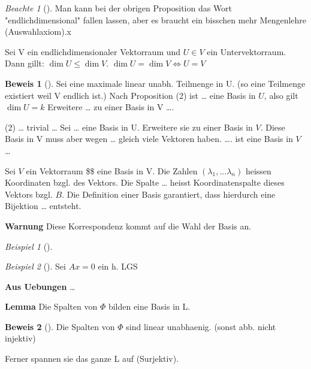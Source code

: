 \documentclass[11pt]{article}
\theoremstyle{remark}
\newtheorem{exa}{Beispiel}[section]
\newtheorem*{notte}{Beachte}
\theoremstyle{definition}
\newtheorem{prof}{Beweis}
\theoremstyle{remark}
\begin{document}
\begin{notte}[] \label{}
Man kann bei der obrigen Proposition das Wort "endlichdimensional" fallen
lassen, aber es braucht ein bisschen mehr Mengenlehre (Auswahlaxiom).x
\end{notte}


\begin{theo}{}{}
Sei V ein endlichdimensionaler Vektorraum und \(U\in V\) ein Untervektorraum. Dann
gillt: \(\dim U \leq \dim V\).  \(\dim U = \dim V \iff U=V\)
\end{theo}

\begin{prof}[] \label{}
Sei eine maximale linear unabh. Teilmenge in U. (so eine Teilmenge existiert
weil V endlich ist.)
Nach Proposition (2) ist \ldots{} eine Basis in \(U\), also gilt \(\dim U = k\) Erweitere
\ldots{} zu einer Basis in V \ldots{}. 

(2) \ldots{} trivial \ldots{} Sei \ldots{} eine Basis in U. Erweitere sie zu einer Basis in
\(V\). Diese Basis in V muss aber wegen \ldots{} gleich viele Vektoren haben. \ldots{}. ist
eine Basis in \(V\) \ldots{}
\end{prof}


\begin{definition}{}{}
Sei \(V\) ein Vektorraum \$\$ eine Basis in V. Die Zahlen \((\lambda_1,...\lambda_n)\)
heissen Koordinaten bzgl. des Vektors. Die Spalte \ldots{} heisst Koordinatenspalte
dieses Vektors bzgl. \(B\).
Die Definition einer Basis garantiert, dass hierdurch eine Bijektion \ldots{} entsteht.
\end{definition}

\textbf{Warnung} Diese Korrespondenz kommt auf die Wahl der Basis an.

\begin{exa}[] \label{}

\end{exa}

\begin{exa}[] \label{}
Sei \(Ax=0\) ein h. LGS
\end{exa}

\textbf{Aus Uebungen} \ldots{}

\textbf{Lemma} Die Spalten von \(\Phi\) bilden eine Basis in L.
\begin{prof}[] \label{}
Die Spalten von \(\Phi\) sind linear unabhaenig. (sonst abb. nicht injektiv)

Ferner spannen sie das ganze L auf (Surjektiv). 
\end{prof}
\end{document}
